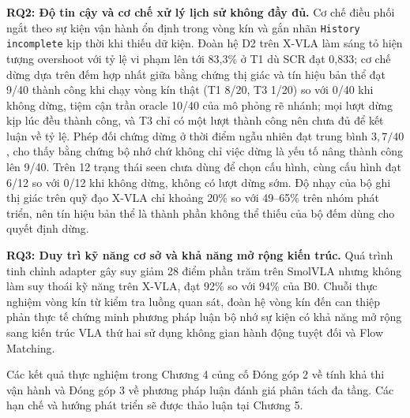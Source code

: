 \textbf{RQ2: Độ tin cậy và cơ chế xử lý lịch sử không đầy đủ.} Cơ chế điều phối ngắt theo sự kiện vận hành ổn định trong vòng kín và gắn nhãn \texttt{History incomplete} kịp thời khi thiếu dữ kiện. Đoàn hệ D2 trên X-VLA làm sáng tỏ hiện tượng overshoot với tỷ lệ vi phạm lên tới 83,3\% ở T1 dù SCR đạt 0,833; cơ chế dừng dựa trên đếm hợp nhất giữa bằng chứng thị giác và tín hiệu bản thể đạt 9/40 thành công khi chạy vòng kín thật (T1 8/20, T3 1/20) so với 0/40 khi không dừng, tiệm cận trần oracle 10/40 của mô phỏng rẽ nhánh; mọi lượt dừng kịp lúc đều thành công, và T3 chỉ có một lượt thành công nên chưa đủ để kết luận về tỷ lệ. Phép đối chứng dừng ở thời điểm ngẫu nhiên đạt trung bình $3{,}7/40$, cho thấy bằng chứng bộ nhớ chứ không chỉ việc dừng là yếu tố nâng thành công lên 9/40. Trên 12 trạng thái seen chưa dùng để chọn cấu hình, cùng cấu hình đạt 6/12 so với 0/12 khi không dừng, không có lượt dừng sớm. Độ nhạy của bộ ghi thị giác trên quỹ đạo X-VLA chỉ khoảng 20\% so với 49--65\% trên nhóm phát triển, nên tín hiệu bản thể là thành phần không thể thiếu của bộ đếm dùng cho quyết định dừng.

\textbf{RQ3: Duy trì kỹ năng cơ sở và khả năng mở rộng kiến trúc.} Quá trình tinh chỉnh adapter gây suy giảm 28 điểm phần trăm trên SmolVLA nhưng không làm suy thoái kỹ năng trên X-VLA, đạt 92\% so với 94\% của B0. Chuỗi thực nghiệm vòng kín từ kiểm tra luồng quan sát, đoàn hệ vòng kín đến can thiệp phản thực tế chứng minh phương pháp luận bộ nhớ sự kiện có khả năng mở rộng sang kiến trúc VLA thứ hai sử dụng không gian hành động tuyệt đối và Flow Matching.

Các kết quả thực nghiệm trong Chương 4 củng cố Đóng góp 2 về tính khả thi vận hành và Đóng góp 3 về phương pháp luận đánh giá phân tách đa tầng. Các hạn chế và hướng phát triển sẽ được thảo luận tại Chương 5.
